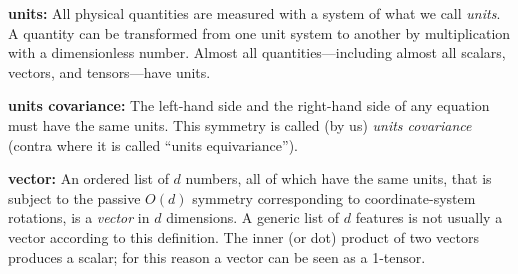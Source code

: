 \documentclass{article}
\theoremstyle{plain}
\theoremstyle{definition}
\theoremstyle{remark}
\begin{document}
\textbf{units:}
All physical quantities are measured with a system of what we call \emph{units}.
A quantity can be transformed from one unit system to another by multiplication with a dimensionless number.
Almost all quantities---including almost all scalars, vectors, and tensors---have units.

\textbf{units covariance:}
The left-hand side and the right-hand side of any equation must have the same units.
This symmetry is called (by us) \emph{units covariance} (contra \citealt{villar2022dimensionless} where it is called ``units equivariance'').

\textbf{vector:}
An ordered list of $d$ numbers, all of which have the same units, that is subject to the passive $O(d)$ symmetry corresponding to coordinate-system rotations, is a \emph{vector} in $d$ dimensions.
A generic list of $d$ features is not usually a vector according to this definition.
The inner (or dot) product of two vectors produces a scalar; for this reason a vector can be seen as a 1-tensor.
\end{document}
